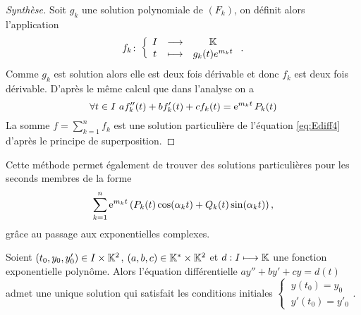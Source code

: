 \begin{proof}[Synthèse]
Soit $g_k$ une solution polynomiale de $(F_k)$, on définit alors l'application
\begin{equation}
  f_k\colon \left\{\begin{array}{ccc} I & \longrightarrow &\mathbb{K}\\ t & \longmapsto & g_k(t)e^{m_k t} \end{array} \right..
\end{equation}
Comme $g_k$ est solution alors elle est deux fois dérivable et donc $f_k$ est deux fois dérivable. D'après le même calcul que dans l'analyse on a
  \begin{equation}
    \forall t \in I \ af_k''(t)+bf_k'(t)+cf_k(t)=\e^{m_k t} P_k(t)
  \end{equation}
La somme $f=\sum_{k=1}^n f_k$ est une solution particulière de l'équation \eqref{eq:Ediff4} d'après le principe de superposition.
\end{proof}
%
Cette méthode permet également de trouver des solutions particulières pour les seconds membres de la forme
\begin{equation}
\sum_{k=1}^n \operatorname{e}^{m_k t} \left( P_k(t) \cos(\alpha_k t) +Q_k(t)\sin(\alpha_kt)\right),
\end{equation}
grâce au passage aux exponentielles complexes.
%
\begin{theo}
Soient $(t_0,y_0,y'_0) \in I \times \mathbb{K}^2$, $(a,b,c) \in \mathbb{K}^{*} \times \mathbb{K}^2$ et $d: I \longmapsto \mathbb{K}$ une fonction exponentielle polynôme. Alors l'équation différentielle $ay''+by'+cy=d(t)$ admet une unique solution qui satisfait les conditions initiales $ \left\{~\begin{array}{l} y(t_0)=y_0 \\ y'(t_0)=y'_0 \end{array}\right.$.
\end{theo}
